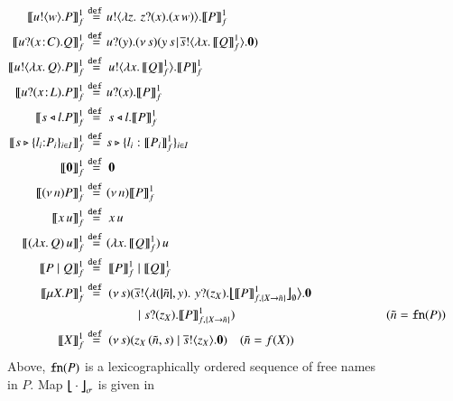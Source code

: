 
\begin{figure}[t!]


\begin{align*}
	\pmapp{\bout{u}{w} P}{1}{f}	&\defeq	\!\bout{u}{ \abs{z}{\,\binp{z}{x} (\appl{x}{w})} } \pmapp{P}{1}{f}
	\\
	\pmapp{\binp{u}{\AT{x}{C}} Q}{1}{f}	&\defeq	\!\binp{u}{y} \newsp{s}{\appl{y}{s} \!\Par\! \bout{\dual{s}}{\abs{x}{\pmapp{Q}{1}{f}}} \inact}
		\\
	\pmapp{\bout{u}{\abs{{x}}{Q}} P}{1}{f}  &\defeq \bout{u}{\abs{{x}}{\pmapp{Q}{1}{f}}} \pmapp{P}{1}{f}
	\\
	\pmapp{\binp{u}{\AT{x}{L}} P}{1}{f} &\defeq \!\binp{u}{x} \pmapp{P}{1}{f}
	\\
	\pmapp{\bsel{s}{l} P}{1}{f} &\defeq \bsel{s}{l} \pmapp{P}{1}{f}
	\\
	\pmapp{\bbra{s}{l_i{:}P_i}_{i \in I}}{1}{f} &\defeq \!\bbra{s}{l_i: \pmapp{P_i}{1}{f}}_{i \in I}
	\\
	\pmapp{\inact}{1}{f} &\defeq \inact
	\\
	\pmapp{\news{n} P}{1}{f} &\defeq \!\news{n} \pmapp{P}{1}{f}
	\\
	\pmapp{{x}\, {u}}{1}{f} &\defeq \appl{x}{u}
	\\
	\pmapp{\appl{(\abs{x}{Q})}{u}}{1}{f} &\defeq \!\appl{(\abs{x}{\pmapp{Q}{1}{f}})}{u}
	\\	
	\pmapp{P \Par Q}{1}{f} & \defeq \pmapp{P}{1}{f} \Par \pmapp{Q}{1}{f}
	\\
	\pmapp{\recp{X}{P}}{1}{f} &\defeq
		\newsp{s}{\bbout{\dual{s}}{\abs{(\vmap{\tilde{n}}, y)} \,{\binp{y}{z_\X} \auxmapp{\pmapp{P}{1}{{f,\{\rvar{X}\to \tilde{n}\}}}}{{}}{\es}}} \inact 
		\\
		& \qquad \qquad \Par  \binp{s}{z_\X} \pmapp{P}{1}{{f,\{\rvar{X}\to \tilde{n}\}}}}
	\qquad \qquad \qquad \qquad \qquad \qquad
	(\tilde{n} = \fn{P})
	\\ 
	\pmapp{\rvar{X}}{1}{f} & \defeq 
		\newsp{s}{\appl{z_X}{(\tilde{n}, s)} \Par \bout{\dual{s}}{ z_X} \inact}  \quad (\tilde{n} = f(\rvar{X}))
\end{align*}
Above,
$\mathtt{fn}(P)$ is a lexicographically ordered sequence  of free names in $P$.
Map
$\big\lfloor\!\!\big\lfloor\cdot\big\rfloor\!\!\big\rfloor^{}_\sigma$ is given in 

\end{figure}
